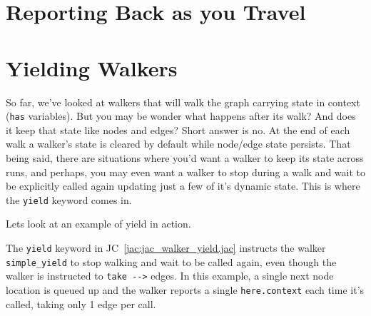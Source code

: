 \par
{}

\par
{}

\section{Reporting Back as you Travel}

\par
{}


\section{Yielding Walkers}

So far, we've looked at walkers that will walk the graph carrying state in context (\lstinline{has} variables).
But you may be wonder what happens after its walk? And does it keep that state like nodes and edges? Short answer is no.
At the end of each walk a walker's state is cleared by default while node/edge state persists.
That being said, there are situations where you'd want a walker to keep its state across runs, and perhaps, you may even want a walker to stop during a walk and wait to be explicitly called again updating just a few of it's dynamic state.
This is where the \lstinline{yield} keyword comes in.
\par
Lets look at an example of yield in action.
\par
{}


\par
The \lstinline{yield} keyword in JC~\ref{jac:jac_walker_yield.jac} instructs the walker \lstinline{simple_yield} to stop walking and wait to be called again, even though the walker is instructed to \lstinline{take -->} edges. In this example, a single next node location is queued up and the walker reports a single \lstinline{here.context} each time it's called, taking only 1 edge per call.

